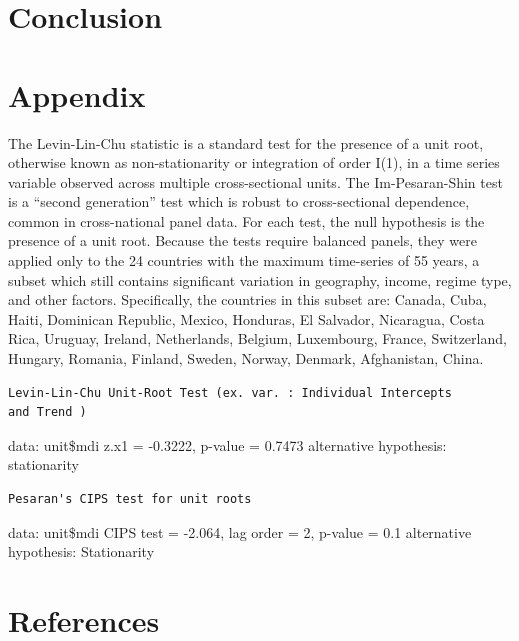 \documentclass[11pt,article,oneside]{memoir}
\begin{document}
\section{Conclusion}\label{conclusion}

\section{Appendix}\label{appendix}

The Levin-Lin-Chu statistic is a standard test for the presence of a
unit root, otherwise known as non-stationarity or integration of order
I(1), in a time series variable observed across multiple cross-sectional
units. The Im-Pesaran-Shin test is a ``second generation'' test which is
robust to cross-sectional dependence, common in cross-national panel
data. For each test, the null hypothesis is the presence of a unit root.
Because the tests require balanced panels, they were applied only to the
24 countries with the maximum time-series of 55 years, a subset which
still contains significant variation in geography, income, regime type,
and other factors. Specifically, the countries in this subset are:
Canada, Cuba, Haiti, Dominican Republic, Mexico, Honduras, El Salvador,
Nicaragua, Costa Rica, Uruguay, Ireland, Netherlands, Belgium,
Luxembourg, France, Switzerland, Hungary, Romania, Finland, Sweden,
Norway, Denmark, Afghanistan, China.

\begin{verbatim}
Levin-Lin-Chu Unit-Root Test (ex. var. : Individual Intercepts
and Trend )
\end{verbatim}

data: unit\$mdi z.x1 = -0.3222, p-value = 0.7473 alternative hypothesis:
stationarity

\begin{verbatim}
Pesaran's CIPS test for unit roots
\end{verbatim}

data: unit\$mdi CIPS test = -2.064, lag order = 2, p-value = 0.1
alternative hypothesis: Stationarity

\pagebreak   

\section*{References}\label{references}

\setlength{\parindent}{-0.2in} \setlength{\leftskip}{0.2in}
\setlength{\parskip}{8pt} \vspace*{-0.2in} \noindent
\end{document}

